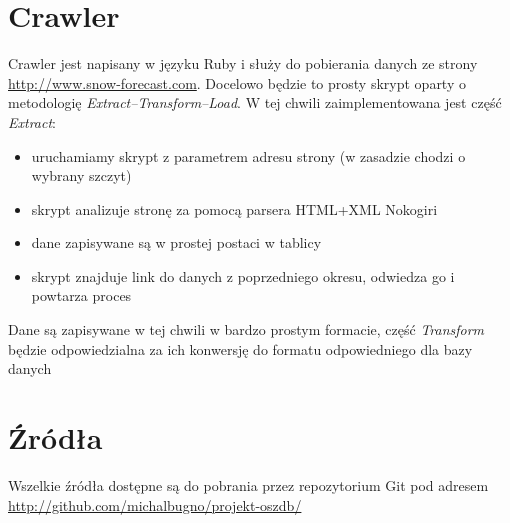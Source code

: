 \documentclass[12pt]{article}
\begin{document}
\section{Crawler}
Crawler jest napisany w języku Ruby i służy do pobierania danych ze strony
\\\url{http://www.snow-forecast.com}.
Docelowo będzie to prosty skrypt oparty o metodologię \emph{Extract--Transform--Load}. W tej chwili zaimplementowana
jest część \emph{Extract}:
\begin{itemize}
\item uruchamiamy skrypt z parametrem adresu strony (w zasadzie chodzi o wybrany szczyt)
\item skrypt analizuje stronę za pomocą parsera HTML+XML Nokogiri
\item dane zapisywane są w prostej postaci w tablicy
\item skrypt znajduje link do danych z poprzedniego okresu, odwiedza go i powtarza proces
\end{itemize}

Dane są zapisywane w tej chwili w bardzo prostym formacie, część \emph{Transform} będzie odpowiedzialna
za ich konwersję do formatu odpowiedniego dla bazy danych

\section{Źródła}
Wszelkie źródła dostępne są do pobrania przez repozytorium Git pod adresem
\\
\url{http://github.com/michalbugno/projekt-oszdb/}
\end{document}
